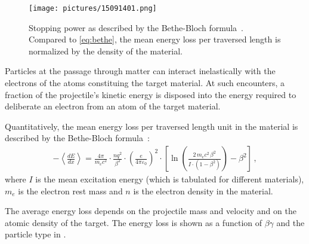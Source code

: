   \begin{figure}[b]
  \centering
  \texttt{[image: pictures/15091401.png]}
  \caption{Stopping power as described by the Bethe-Bloch formula~\cite{Beringer:1900zz}. Compared to \eqref{eq:bethe}, the mean energy loss per traversed length is normalized by the density of the material.}  
  \label{pic:15091401}
  \end{figure}

Particles at the passage through matter can interact inelastically with the electrons of the atoms constituing the target material. At such encounters, a fraction of the projectile's kinetic energy is disposed into the energy required to deliberate an electron from an atom of the target material.

Quantitatively, the mean energy loss per traversed length unit in the material is described by the Bethe-Bloch formula~\cite{Beringer:1900zz}:
\begin{align}
- \left\langle\frac{dE}{dx}\right\rangle = \frac{4 \pi}{m_e c^2} \cdot \frac{nq^2}{\beta^2} \cdot \left(\frac{e}{4\pi\varepsilon_0}\right)^2 \cdot \left[\ln \left(\frac{2 \, m_e c^2 \, \beta^2}{I \cdot (1-\beta^2)}\right) - \beta^2\right] \, , \label{eq:bethe}
\end{align}
where $I$ is the mean excitation energy (which is tabulated for different materials), $m_e$ is the electron rest mass and $n$ is the electron density in the material.


The average energy loss depends on the projectile mass and velocity and on the atomic density of the target. The energy loss is shown as a function of $\beta \gamma$ and the particle type in .

